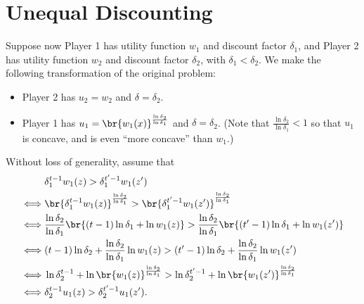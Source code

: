 
\section{Unequal Discounting}

Suppose now Player 1 has utility function $w_1$ and discount factor $\delta_1$, and Player 2 has utility function $w_2$ and discount factor $\delta_2$, with $\delta_1 < \delta_2$. We make the following transformation of the original problem:
\begin{itemize}
  \item Player 2 has $u_2 = w_2$ and $\delta = \delta_2$.
  \item Player 1 has $u_1 = \br{w_1(x)}^{\frac{\ln \delta_2}{\ln \delta_1}}$ and $\delta  = \delta_2$. (Note that $\frac{\ln \delta_2}{\ln \delta_1} < 1$ so that $u_1$ is concave, and is even ``more concave'' than $w_1$.)
\end{itemize}

Without loss of generality, assume that
\[
\begin{aligned}
  & \delta_1^{t-1}w_1(z)>\delta_1^{t'-1}w_1(z')\\
  \iff & \br{\delta_1^{t-1}w_1(z)}^{\frac{\ln \delta_2}{\ln \delta_1}}>\br{\delta_1^{t'-1}w_1(z')}^{\frac{\ln \delta_2}{\ln \delta_1}}\\
  \iff & \frac{\ln \delta_2}{\ln \delta_1}\br{(t-1)\ln \delta_1+ \ln w_1(z)} > \frac{\ln \delta_2}{\ln \delta_1} \br{(t'-1)\ln \delta_1+ \ln w_1(z')}\\
  \iff & (t-1)\ln \delta_2 + \frac{\ln \delta_2}{\ln \delta_1}\ln w_1(z) > (t'-1)\ln \delta_2 + \frac{\ln \delta_2}{\ln \delta_1}\ln w_1(z')\\
  \iff & \ln \delta_2^{t-1} + \ln \br{w_1(z)}^{\frac{\ln \delta_2}{\ln \delta_1}} > \ln \delta_2^{t'-1} + \ln \br{w_1(z')}^{\frac{\ln \delta_2}{\ln \delta_1}}\\
  \iff & \delta_2^{t-1}u_1(z) > \delta_2^{t'-1}u_1(z').
\end{aligned}
\]

